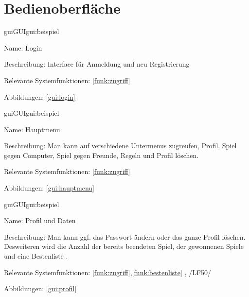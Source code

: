 
\section{Bedienoberfläche}


\setcounter{gui}{10}

\begin{description}[leftmargin=5em, style=sameline]	
	\begin{lhp}{gui}{GUI}{gui:beispiel}
		\item[Name:] Login
		\item[Beschreibung:] Interface für Anmeldung und neu Registrierung
		\item[Relevante Systemfunktionen:] \ref{funk:zugriff}
		\item[Abbildungen:] \ref{gui:login}
	\end{lhp}
\end{description}

\begin{description}[leftmargin=5em, style=sameline]	
	\begin{lhp}{gui}{GUI}{gui:beispiel}
		\item[Name:] Hauptmenu
		\item[Beschreibung:] Man kann auf verschiedene Untermenus zugreufen, Profil, Spiel gegen Computer, Spiel gegen Freunde, Regeln und Profil löschen.
		\item[Relevante Systemfunktionen:] 
		\ref{funk:zugriff}
		\item[Abbildungen:] \ref{gui:hauptmenu}
	\end{lhp}
\end{description}

\begin{description}[leftmargin=5em, style=sameline]	
	\begin{lhp}{gui}{GUI}{gui:beispiel}
		\item[Name:] Profil und Daten

		\item[Beschreibung:] Man kann ggf. das Passwort ändern oder das ganze Profil löschen. Desweiteren wird die Anzahl der bereits beendeten Spiel, der gewonnenen Spiele und eine Bestenliste .

		\item[Relevante Systemfunktionen:]  \ref{funk:zugriff},\ref{funk:bestenliste} , /LF50/
		\item[Abbildungen:] \ref{gui:profil}
	\end{lhp}
\end{description}

